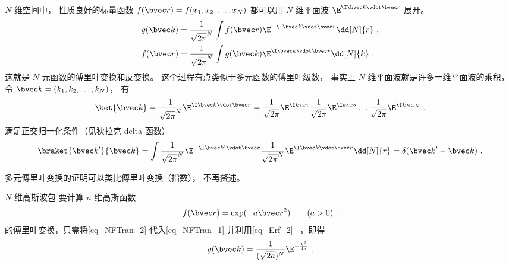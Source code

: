 

$N$ 维空间中， 性质良好的标量函数 $f(\bvec r) = f(x_1, x_2, \dots, x_N)$ 都可以用 $N$ 维平面波 $\E^{\I \bvec k\vdot \bvec r}$ 展开。
\begin{align}
g(\bvec k) &= \frac{1}{\sqrt{2\pi}^N} \int f(\bvec r) \E^{-\I \bvec k \vdot \bvec r} \dd[N]{r}\label{eq_NFTran_1}~,\\
f(\bvec r) &= \frac{1}{\sqrt{2\pi}^N} \int g(\bvec k) \E^{\I \bvec k \vdot \bvec r} \dd[N]{k}~.
\end{align}
这就是 $N$ 元函数的傅里叶变换和反变换。 这个过程有点类似于多元函数的傅里叶级数， 事实上 $N$ 维平面波就是许多一维平面波的乘积， 令 $\bvec k = (k_1, k_2, \dots, k_N)$， 有
\begin{equation}
\ket{\bvec k} = \frac{1}{\sqrt{2\pi}^N}\E^{\I \bvec k \vdot \bvec r} = \frac{1}{\sqrt{2\pi}} \E^{\I k_1 x_1} \frac{1}{\sqrt{2\pi}} \E^{\I k_2 x_2} \dots \frac{1}{\sqrt{2\pi}} \E^{\I k_N x_N}~.
\end{equation}
满足正交归一化条件（见狄拉克 delta 函数）
\begin{equation}
\braket{\bvec k'}{\bvec k} = \int \frac{1}{\sqrt{2\pi}^N}\E^{-\I \bvec k' \vdot \bvec r} \frac{1}{\sqrt{2\pi}^N}\E^{\I \bvec k \vdot \bvec r} \dd[N]{r} = \delta(\bvec k'- \bvec k)~.
\end{equation}

多元傅里叶变换的证明可以类比傅里叶变换（指数）， 不再赘述。

\begin{example}{$N$ 维高斯波包}
要计算 $n$ 维高斯函数
\begin{equation}\label{eq_NFTran_2}
f(\bvec r) = \exp(-a\bvec r^2) \qquad (a > 0)~.
\end{equation}
的傅里叶变换，只需将\autoref{eq_NFTran_2} 代入\autoref{eq_NFTran_1} 并利用\autoref{eq_Erf_2}~ ，即得
\begin{equation}
g(\bvec k) = \frac{1}{(\sqrt{2a})^N}\E^{-\frac{k^2}{4a}}~.
\end{equation}
\end{example}
